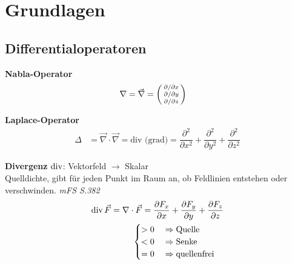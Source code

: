 \section{Grundlagen}
\subsection{Differentialoperatoren}

\textbf{Nabla-Operator}
\begin{align*}
    \nabla & = \vec{\nabla} = 
    \begin{psmallmatrix}
        \partial  / \partial x \\
        \partial  / \partial y \\
        \partial  / \partial z
    \end{psmallmatrix}
\end{align*}

\textbf{Laplace-Operator}
\begin{align*}
    \varDelta  & = \vec{\nabla} \cdot \vec{\nabla} = \textrm{div (grad)} = 
    \dfrac{\partial ^2}{\partial x^2}+\dfrac{\partial ^2}{\partial y^2}+\dfrac{\partial ^2}{\partial z^2}
\end{align*}

\textbf{Divergenz} $\operatorname{div}$: Vektorfeld $\rightarrow$ Skalar\\
\small{Quelldichte, gibt für jeden Punkt im Raum an, ob Feldlinien entstehen oder verschwinden. \textit{mFS S.382}}
\begin{align*}
    \operatorname{div} \vec{F} = \nabla \cdot \vec{F}   =  \dfrac{\partial F_x}{\partial x} 
    + \dfrac{\partial F_y}{\partial y} + \dfrac{\partial F_z}{\partial z}\\ 
                                 \begin{cases}
    > 0 \quad\Rightarrow \textnormal{Quelle}  \\
    < 0 \quad\Rightarrow \textnormal{Senke} \\
    = 0 \quad\Rightarrow \textnormal{quellenfrei} 
\end{cases}                                      
\end{align*}\\

